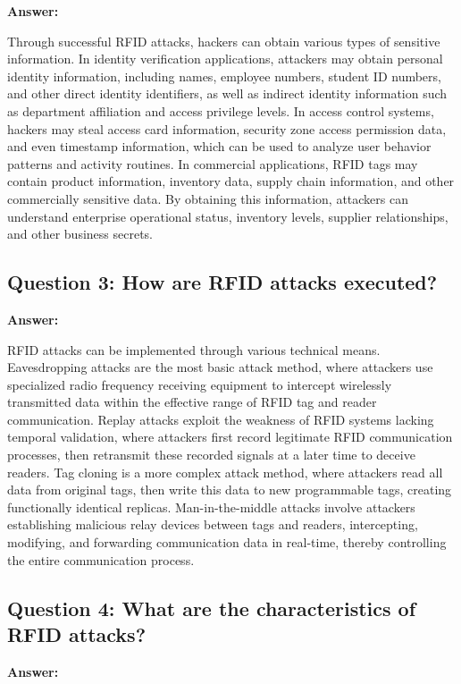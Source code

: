 \documentclass[12pt,a4paper]{article}
\begin{document}
\textbf{Answer:}

Through successful RFID attacks, hackers can obtain various types of sensitive information. In identity verification applications, attackers may obtain personal identity information, including names, employee numbers, student ID numbers, and other direct identity identifiers, as well as indirect identity information such as department affiliation and access privilege levels. In access control systems, hackers may steal access card information, security zone access permission data, and even timestamp information, which can be used to analyze user behavior patterns and activity routines. In commercial applications, RFID tags may contain product information, inventory data, supply chain information, and other commercially sensitive data. By obtaining this information, attackers can understand enterprise operational status, inventory levels, supplier relationships, and other business secrets.

\subsection{Question 3: How are RFID attacks executed?}

\textbf{Answer:}

RFID attacks can be implemented through various technical means. Eavesdropping attacks are the most basic attack method, where attackers use specialized radio frequency receiving equipment to intercept wirelessly transmitted data within the effective range of RFID tag and reader communication. Replay attacks exploit the weakness of RFID systems lacking temporal validation, where attackers first record legitimate RFID communication processes, then retransmit these recorded signals at a later time to deceive readers. Tag cloning is a more complex attack method, where attackers read all data from original tags, then write this data to new programmable tags, creating functionally identical replicas. Man-in-the-middle attacks involve attackers establishing malicious relay devices between tags and readers, intercepting, modifying, and forwarding communication data in real-time, thereby controlling the entire communication process.

\subsection{Question 4: What are the characteristics of RFID attacks?}

\textbf{Answer:}
\end{document}
